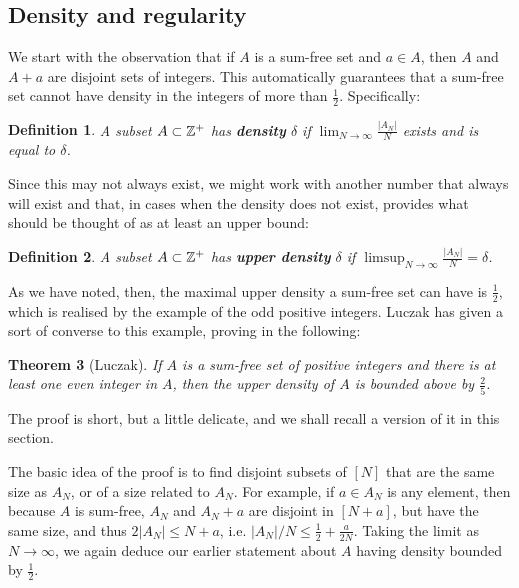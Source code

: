 \documentclass{report}
\newtheorem{theorem}{Theorem}[section]
\newtheorem{definition}[theorem]{Definition}
\theoremstyle{remark}
\numberwithin{equation}{section}
\begin{document}
\subsection{Density and regularity}

We start with the observation that if $A$ is a sum-free set and
$a \in A$, then $A$ and $A+a$ are disjoint sets of integers.  This
automatically guarantees that a sum-free set cannot have density in
the integers of more than $\frac12$.  Specifically: 

\begin{definition}
  A subset $A \subset \mathbb{Z}^+$ has \textbf{density} $\delta$ if
  $\lim_{N \to \infty} \frac{|A_N|}{N}$ exists and is equal to
  $\delta$.
\end{definition}

Since this may not always exist, we might work with another number
that always will exist and that, in cases when the density does not
exist, provides what should be thought of as at least an upper bound: 

\begin{definition}
  A subset $A \subset \mathbb{Z}^+$ has \textbf{upper density} $\delta$ if
  $\limsup_{N \to \infty}\frac{|A_N|}{N} = \delta$.
\end{definition}

As we have noted, then, the maximal upper density a sum-free set can
have is $\frac12$, which is realised by the example of the odd
positive integers.  Luczak has given a sort of converse to this
example, proving in \cite{luczak:jct1995} the following: 

\begin{theorem}[Luczak]
If $A$ is a sum-free set of positive integers and there is at least
one even integer in $A$, then the upper density of $A$ is bounded
above by $\frac25$.  
\end{theorem}  

The proof is short, but a
little delicate, and we shall recall a version of it in this section.

The basic idea of the proof is to find disjoint subsets of $[N]$ that
are the same size as $A_N$, or of a size related to $A_N$.  For
example, if $a \in A_N$ is any element, then because $A$ is sum-free,
$A_N$ and $A_N+a$ are disjoint in $[N+a]$, but have the same size, and
thus $2|A_N| \leq N+a$, i.e. $|A_N|/N \leq \frac12 + \frac{a}{2N}$.
Taking the limit as $N \to \infty$, we again deduce our earlier
statement about $A$ having density bounded by $\frac12$.
\end{document}
